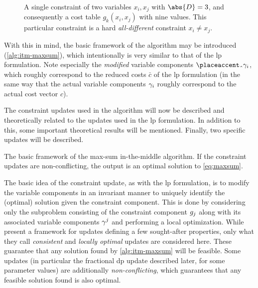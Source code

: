 \begin{figure}[tp]
	\centering
	
	\caption{A single constraint of two variables \(x_i,x_j\) with \(\abs{D}=3\), and consequently a cost table \(g_k(x_i,x_j)\) with nine values. This particular constraint is a hard \emph{all-different} constraint \(x_i\neq x_j\).}
	\label{fig:maxsum-components}
\end{figure}

With this in mind, the basic framework of the algorithm may be introduced (\cref{alg:itm-maxsum}), which intentionally is very similar to that of the \gls{lp} formulation.
Note especially the \emph{modified} variable components \(\hat{\vcomp}_i\), which roughly correspond to the reduced costs \(\bar{c}\) of the \gls{lp} formulation (in the same way that the actual variable components \(\gamma_i\) roughly correspond to the actual cost vector \(c\)).

The constraint updates used in the algorithm will now be described and theoretically related to the updates used in the \gls{lp} formulation. In addition to this, some important theoretical results will be mentioned.
Finally, two specific updates will be described.

\begin{algorithm}[tbp]

	\caption{
		The basic framework of the max-sum in-the-middle algorithm.
		If the constraint updates are non-conflicting, the output is an optimal solution to \cref{eq:maxsum}.
	}
	\label{alg:itm-maxsum}
\end{algorithm}

The basic idea of the constraint update, as with the \gls{lp} formulation, is to modify the variable components in an invariant manner to uniquely identify the (optimal) solution given the constraint component.
This is done by considering only the subproblem consisting of the constraint component \(g_j\) along with its associated variable components \(\gamma^j\) and performing a local optimization.
While \textcite[\pno~100\psq]{Wedelin08} present a framework for updates defining a few sought-after properties, only what they call \emph{consistent} and \emph{locally optimal} updates are considered here.
These guarantee that any solution found by \cref{alg:itm-maxsum} will be feasible.
Some updates (in particular the fractional \acrshort{dp} update described later, for some parameter values) are additionally \emph{non-conflicting}, which guarantees that any feasible solution found is also optimal.

